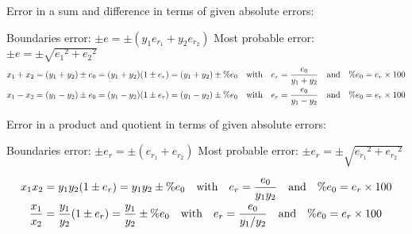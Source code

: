 \documentclass{report}
\begin{document}
\begin{itemize}
	\ii Error in a sum and difference in terms of given absolute errors:
	\begin{itemize}
		\ii Boundaries error: $\pm e = \pm (y_1e_{r_1} + y_2e_{r_2})$
		\ii Most probable error: $\pm e = \pm \sqrt{{e_{1}}^2 + {e_{2}}^2}$
		\begin{align*}
			x_1 + x_2 & = (y_1 + y_2) \pm e_0 = (y_1 + y_2)(1\pm e_r) = (y_1 + y_2) \pm \% e_0 \qq{with} e_r = \frac{e_0}{y_1+y_2} \qand \% e_0 = e_r \times 100 \\
			x_1 - x_2 & = (y_1 - y_2) \pm e_0 = (y_1 - y_2)(1\pm e_r) = (y_1 - y_2) \pm \% e_0 \qq{with} e_r = \frac{e_0}{y_1-y_2} \qand \% e_0 = e_r \times 100
		\end{align*}
	\end{itemize}

	\ii Error in a product and quotient in terms of given absolute errors:
	\begin{itemize}
		\ii Boundaries error: $\pm e_r = \pm (e_{r_1} + e_{r_2})$
		\ii Most probable error: $\pm e_r = \pm \sqrt{{e_{r_1}}^2 + {e_{r_2}}^2}$

		\begin{align*}
			x_1x_2          & = y_1y_2(1\pm e_r) = y_1y_2 \pm \% e_0 \qq{with} e_r = \frac{e_0}{y_1y_2} \qand \% e_0 = e_r \times 100                    \\
			\frac{x_1}{x_2} & = \frac{y_1}{y_2}(1\pm e_r) = \frac{y_1}{y_2} \pm \% e_0 \qq{with} e_r = \frac{e_0}{y_1/y_2} \qand \% e_0 = e_r \times 100
		\end{align*}
	\end{itemize}
\end{itemize}
\end{document}
